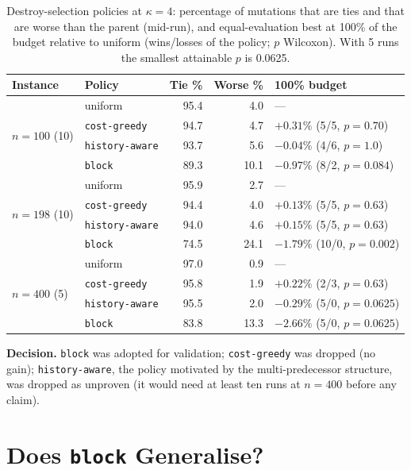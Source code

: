 \begin{table}[htbp]
\centering
\caption{Destroy-selection policies at $\kappa=4$: percentage of mutations that are ties and that are worse than the parent (mid-run), and equal-evaluation best at 100\% of the budget relative to uniform (wins/losses of the policy; $p$ Wilcoxon). With 5 runs the smallest attainable $p$ is 0.0625.}
\label{tab:policies}
\small
\begin{tabular}{llrrl}
\toprule
\textbf{Instance} & \textbf{Policy} & \textbf{Tie \%} & \textbf{Worse \%} & \textbf{100\% budget}\\
\midrule
\multirow{4}{*}{$n=100$ (10)} & uniform & 95.4 & 4.0 & ---\\
 & \texttt{cost-greedy} & 94.7 & 4.7 & $+0.31\%$ (5/5, $p=0.70$)\\
 & \texttt{history-aware} & 93.7 & 5.6 & $-0.04\%$ (4/6, $p=1.0$)\\
 & \texttt{block} & 89.3 & 10.1 & $-0.97\%$ (8/2, $p=0.084$)\\
\midrule
\multirow{4}{*}{$n=198$ (10)} & uniform & 95.9 & 2.7 & ---\\
 & \texttt{cost-greedy} & 94.4 & 4.0 & $+0.13\%$ (5/5, $p=0.63$)\\
 & \texttt{history-aware} & 94.0 & 4.6 & $+0.15\%$ (5/5, $p=0.63$)\\
 & \texttt{block} & 74.5 & 24.1 & $-1.79\%$ (10/0, $p=0.002$)\\
\midrule
\multirow{4}{*}{$n=400$ (5)} & uniform & 97.0 & 0.9 & ---\\
 & \texttt{cost-greedy} & 95.8 & 1.9 & $+0.22\%$ (2/3, $p=0.63$)\\
 & \texttt{history-aware} & 95.5 & 2.0 & $-0.29\%$ (5/0, $p=0.0625$)\\
 & \texttt{block} & 83.8 & 13.3 & $-2.66\%$ (5/0, $p=0.0625$)\\
\bottomrule
\end{tabular}
\end{table}

\textbf{Decision.} \texttt{block} was adopted for validation; \texttt{cost-greedy} was dropped (no gain); \texttt{history-aware}, the policy motivated by the multi-predecessor structure, was dropped as unproven (it would need at least ten runs at $n=400$ before any claim).


\section{Does \texttt{block} Generalise?}\label{sec:exp-validate}

